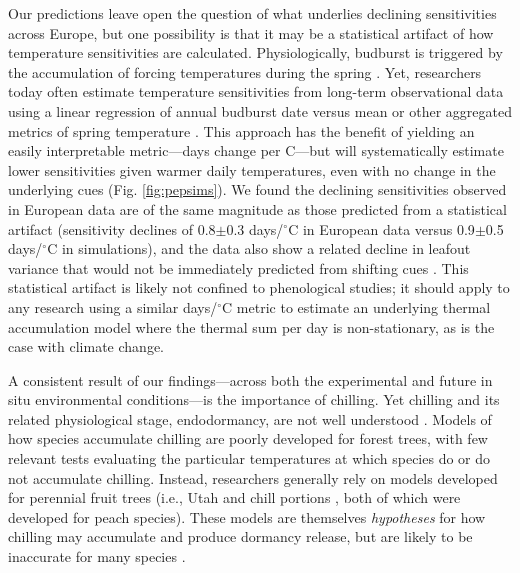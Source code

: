 \documentclass{article}
\begin{document}
\par Our predictions leave open the question of what underlies declining sensitivities across Europe, but one possibility is that it may be a statistical artifact of how temperature sensitivities are calculated.
Physiologically, budburst is triggered by the accumulation of forcing temperatures during the spring \citep{hanninen1995,chuine2016}. Yet, researchers today often estimate temperature sensitivities from long-term observational data using a linear regression of annual budburst date versus mean or other aggregated metrics of spring temperature \citep[e.g.,][]{Wolkovich:2012n}. This approach has the benefit of yielding an easily interpretable metric---days change per \degree C---but will systematically estimate lower sensitivities given warmer daily temperatures, even with no change in the underlying cues (Fig. \ref{fig:pepsims}). We found the declining sensitivities observed in European data are of the same magnitude as those predicted from a statistical artifact (sensitivity declines of 0.8$\pm$0.3 days/$^{\circ}$C in European data versus 0.9$\pm$0.5 days/$^{\circ}$C in simulations), and the data also show a related decline in leafout variance that would not be immediately predicted from shifting cues \citep[see \emph{Potential statistical artifacts in declines of temperature sensitivity observational long-term data} in the Supplemental Materials and ][for further details]{gusewell2017}. This statistical artifact is likely not confined to phenological studies; it should apply to any research using a similar days/$^{\circ}$C metric to estimate an underlying thermal accumulation model where the thermal sum per day is non-stationary, as is the case with climate change. 

\par A consistent result of our findings---across both the experimental and future in situ environmental conditions---is the importance of chilling. Yet chilling and its related physiological stage, endodormancy, are not well understood \citep{chuine2016}. Models of how species accumulate chilling are poorly developed for forest trees, with few relevant tests evaluating the particular temperatures at which species do or do not accumulate chilling. Instead, researchers generally rely on models developed for perennial fruit trees (i.e., Utah \citep{richardson1974} and chill portions \citep{fishman1987}, both of which were developed for peach species). These models are themselves \emph{hypotheses} for how chilling may accumulate and produce dormancy release, but are likely to be inaccurate for many species \citep{dennis2003}. 
\end{document}
